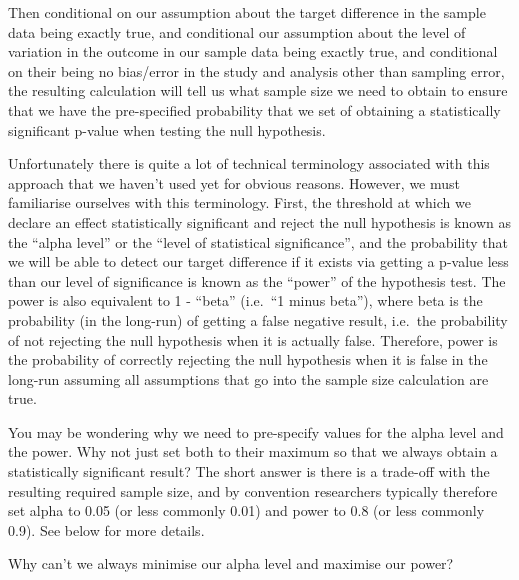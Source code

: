 \documentclass[
]{book}
\begin{document}
Then conditional on our assumption about the target difference in the sample data being exactly true, and conditional our assumption about the level of variation in the outcome in our sample data being exactly true, and conditional on their being no bias/error in the study and analysis other than sampling error, the resulting calculation will tell us what sample size we need to obtain to ensure that we have the pre-specified probability that we set of obtaining a statistically significant p-value when testing the null hypothesis.

Unfortunately there is quite a lot of technical terminology associated with this approach that we haven't used yet for obvious reasons. However, we must familiarise ourselves with this terminology. First, the threshold at which we declare an effect statistically significant and reject the null hypothesis is known as the ``alpha level'' or the ``level of statistical significance'', and the probability that we will be able to detect our target difference if it exists via getting a p-value less than our level of significance is known as the ``power'' of the hypothesis test. The power is also equivalent to 1 - ``beta'' (i.e.~``1 minus beta''), where beta is the probability (in the long-run) of getting a false negative result, i.e.~the probability of not rejecting the null hypothesis when it is actually false. Therefore, power is the probability of correctly rejecting the null hypothesis when it is false in the long-run assuming all assumptions that go into the sample size calculation are true.

You may be wondering why we need to pre-specify values for the alpha level and the power. Why not just set both to their maximum so that we always obtain a statistically significant result? The short answer is there is a trade-off with the resulting required sample size, and by convention researchers typically therefore set alpha to 0.05 (or less commonly 0.01) and power to 0.8 (or less commonly 0.9). See below for more details.

Why can't we always minimise our alpha level and maximise our power?
\end{document}
